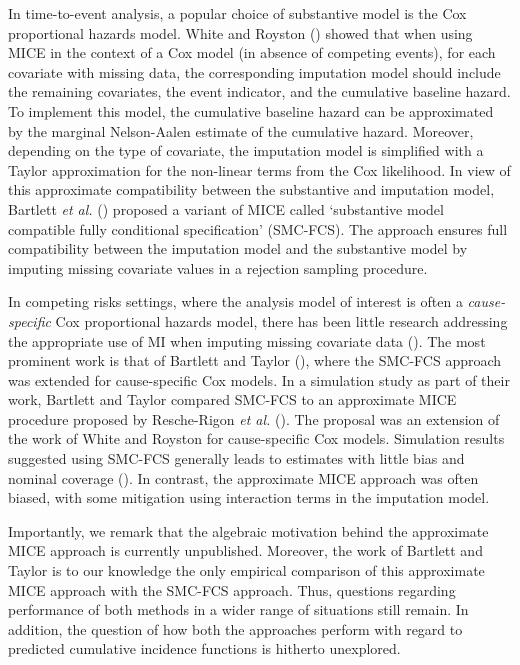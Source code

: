 \documentclass[
  letterpaper,
  paper=240mm:170mm,
  twoside=true,
  open=right,
  fontsize=10pt,
  pagesize=false,
  BCOR=15mm,
  DIV=14,
  headinclude=true,
  footinclude=false,
  headsepline=on]{scrbook}
\begin{document}
In time-to-event analysis, a popular choice of substantive model is the
Cox proportional hazards model. White and Royston
() showed that
when using MICE in the context of a Cox model (in absence of competing
events), for each covariate with missing data, the corresponding
imputation model should include the remaining covariates, the event
indicator, and the cumulative baseline hazard. To implement this model,
the cumulative baseline hazard can be approximated by the marginal
Nelson-Aalen estimate of the cumulative hazard. Moreover, depending on
the type of covariate, the imputation model is simplified with a Taylor
approximation for the non-linear terms from the Cox likelihood. In view
of this approximate compatibility between the substantive and imputation
model, Bartlett \emph{et al.}
() proposed
a variant of MICE called `substantive model compatible fully conditional
specification' (SMC-FCS). The approach ensures full compatibility
between the imputation model and the substantive model by imputing
missing covariate values in a rejection sampling procedure.

In competing risks settings, where the analysis model of interest is
often a \emph{cause-specific} Cox proportional hazards model, there has
been little research addressing the appropriate use of MI when imputing
missing covariate data
(). The most prominent work is that of Bartlett and Taylor
(), where the
SMC-FCS approach was extended for cause-specific Cox models. In a
simulation study as part of their work, Bartlett and Taylor compared
SMC-FCS to an approximate MICE procedure proposed by Resche-Rigon
\emph{et al.}
(). The
proposal was an extension of the work of White and Royston for
cause-specific Cox models. Simulation results suggested using SMC-FCS
generally leads to estimates with little bias and nominal coverage
(). In contrast, the approximate MICE approach was often
biased, with some mitigation using interaction terms in the imputation
model.

Importantly, we remark that the algebraic motivation behind the
approximate MICE approach is currently unpublished. Moreover, the work
of Bartlett and Taylor is to our knowledge the only empirical comparison
of this approximate MICE approach with the SMC-FCS approach. Thus,
questions regarding performance of both methods in a wider range of
situations still remain. In addition, the question of how both the
approaches perform with regard to predicted cumulative incidence
functions is hitherto unexplored.
\end{document}
